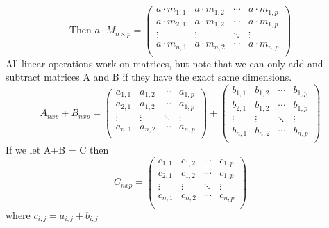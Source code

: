 \begin{equation*}
\text{Then    }a \cdot M_{n \times p} = 
    \begin{pmatrix}
    a \cdot m_{1,1} & a \cdot m_{1,2} & \cdots & a \cdot m_{1,p} \\
    a \cdot m_{2,1} & a \cdot m_{1,2} & \cdots & a \cdot m_{1,p} \\
    \vdots & \vdots & \ddots & \vdots \\
    a \cdot m_{n,1} & a \cdot m_{n,2} & \cdots & a \cdot m_{n,p} \\
    \end{pmatrix}
\end{equation*}
All linear operations work on matrices, but note that we can only add and subtract matrices A and B if they have the exact same dimensions.
\begin{equation*}
    A_{nxp}+ B_{nxp} = 
    \begin{pmatrix}
    a_{1,1} & a_{1,2} & \cdots & a_{1,p} \\
    a_{2,1} & a_{1,2} & \cdots & a_{1,p} \\
    \vdots & \vdots & \ddots & \vdots \\
    a_{n,1} & a_{n,2} & \cdots & a_{n,p} \\
    \end{pmatrix} +
    \begin{pmatrix}
    b_{1,1} & b_{1,2} & \cdots & b_{1,p} \\
    b_{2,1} & b_{1,2} & \cdots & b_{1,p} \\
    \vdots & \vdots & \ddots & \vdots \\
    b_{n,1} & b_{n,2} & \cdots & b_{n,p} \\
    \end{pmatrix}
\end{equation*}
If we let A+B = C then 
\begin{equation*}
C_{nxp} = 
    \begin{pmatrix}
    c_{1,1} & c_{1,2} & \cdots & c_{1,p} \\
    c_{2,1} & c_{1,2} & \cdots & c_{1,p} \\
    \vdots & \vdots & \ddots & \vdots \\
    c_{n,1} & c_{n,2} & \cdots & c_{n,p} \\
    \end{pmatrix}
\end{equation*}
where $c_{i,j}=a_{i,j}+b_{i,j}$

